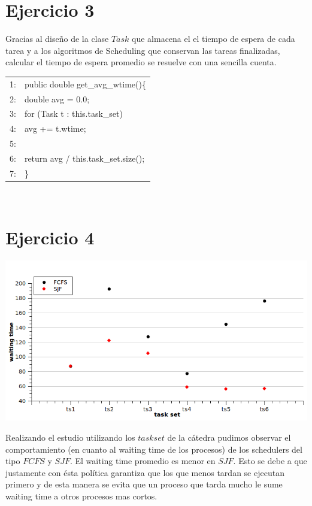 \documentclass[a4paper, 10pt]{article}
\begin{document}
\section{Ejercicio 3}
Gracias al dise\~no de la clase $Task$ que almacena el el tiempo de espera de cada tarea y a los algoritmos de Scheduling que conservan las tareas finalizadas, calcular el tiempo de espera promedio se resuelve con una sencilla cuenta.\\

\begin{tabular}{rp{12cm}}
1: & public double get\_avg\_wtime()\{\\
2: & \hspace{0,5cm} 	double avg = 0.0;\\
3: & \hspace{0,5cm} 	for (Task t : this.task\_set)\\
4: & \hspace{1,0cm} 	avg += t.wtime;\\
5: & \\
6: & \hspace{0,5cm} 	return avg / this.task\_set.size();\\
7: & \}\\
\end{tabular}\\

\newpage

\section{Ejercicio 4}
\begin{center}
	\includegraphics[scale=0.4]{graficos/waitingTime_FCFS-SJF.png}
\end{center}

 	Realizando el estudio utilizando los $taskset$ de la c\'atedra pudimos observar el comportamiento (en cuanto al waiting time de los procesos) de los schedulers del tipo $FCFS$ y $SJF$. El waiting time promedio es menor en $SJF$. Esto se debe a que justamente con \'esta pol\'itica garantiza que los que menos tardan se ejecutan primero y de esta manera se evita que un proceso que tarda mucho le sume waiting time a otros procesos mas cortos.
 
\end{document}
